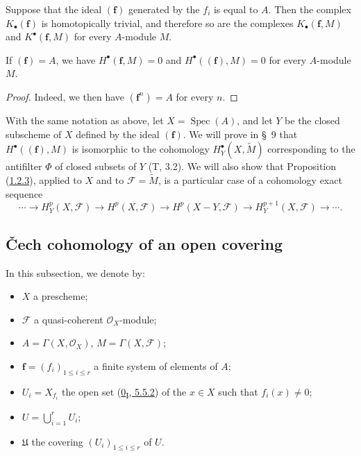 \begin{proposition}[1.1.8]
\label{III.1.1.8}
Suppose that the ideal $(\mathbf f)$ generated by the $f_i$ is equal to $A$.
Then the complex $K_\bullet(\mathbf f)$ is homotopically trivial, and
therefore so are the complexes $K_\bullet(\mathbf f,M)$ and
$K^\bullet(\mathbf f,M)$ for every $A$-module $M$.
\end{proposition}

\begin{corollary}[1.1.9]
\label{III.1.1.9}
If $(\mathbf f)=A$, we have $H^\bullet(\mathbf f,M)=0$ and
$H^\bullet((\mathbf f),M)=0$ for every $A$-module $M$.
\end{corollary}

\begin{proof}
Indeed, we then have $(\mathbf f^n)=A$ for every $n$.
\end{proof}

\begin{remark}[1.1.10]
\label{III.1.1.10}
With the same notation as above, let $X=\operatorname{Spec}(A)$, and
let $Y$ be the closed subscheme of $X$ defined by the ideal $(\mathbf f)$. We
will prove in \S~9 that $H^\bullet((\mathbf f),M)$ is isomorphic to the
cohomology $H_Y^\bullet(X,\widetilde M)$ corresponding to the antifilter
$\Phi$ of closed subsets of $Y$ (T, 3.2). We will also show that
Proposition (\hyperref[III.1.2.3]{1.2.3}), applied to $X$ and to
$\mathcal F=\widetilde M$, is a particular case of a cohomology exact
sequence
\[
\cdots\longrightarrow H_Y^p(X,\mathcal F)\longrightarrow H^p(X,\mathcal F)
\longrightarrow H^p(X-Y,\mathcal F)\longrightarrow H_Y^{p+1}(X,\mathcal F)
\longrightarrow\cdots.
\]
\end{remark}

\subsection{Čech cohomology of an open covering}
\label{subsection:III.1.2}

\begin{notation}[1.2.1]
\label{III.1.2.1}
In this subsection, we denote by:
\begin{itemize}
\item $X$ a prescheme;
\item $\mathcal F$ a quasi-coherent $\mathcal O_X$-module;
\item $A=\Gamma(X,\mathcal O_X)$, $M=\Gamma(X,\mathcal F)$;
\item $\mathbf f=(f_i)_{1\leq i\leq r}$ a finite system of elements of $A$;
\item $U_i=X_{f_i}$ the open set
(\hyperref[0.5.5.2]{0\textsubscript{I}, 5.5.2}) of the $x\in X$ such that
$f_i(x)\neq0$;
\item $U=\bigcup_{i=1}^r U_i$;
\item $\mathfrak U$ the covering $(U_i)_{1\leq i\leq r}$ of $U$.
\end{itemize}
\end{notation}

